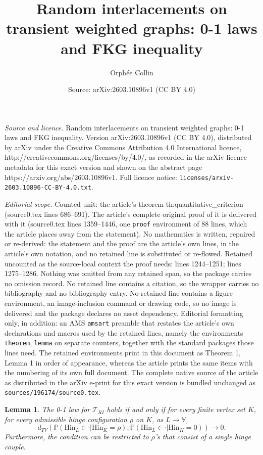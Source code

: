 \documentclass[10pt,a4paper]{amsart}
\title{Random interlacements on transient weighted graphs: 0-1 laws and FKG inequality}
\author{Orph\'ee Collin}
\date{Source: arXiv:2603.10896v1 (CC BY 4.0)}
\newtheorem{lemma}{Lemma}
\newcommand{\Hin}{\mathrm{Hin}}
\begin{document}
\maketitle

\noindent\emph{Source and licence.} Random interlacements on transient weighted graphs: 0-1 laws and FKG inequality. Version arXiv:2603.10896v1 (CC BY 4.0), distributed by arXiv under the Creative Commons Attribution 4.0 International licence, http://creativecommons.org/licenses/by/4.0/, as recorded in the arXiv licence metadata for this exact version and shown on the abstract page https://arxiv.org/abs/2603.10896v1. Full licence notice: \texttt{licenses/arxiv-2603.10896-CC-BY-4.0.txt}.\par\smallskip

\noindent\textit{Editorial scope.} Counted unit: the article's theorem th:quantitative\_criterion (source0.tex lines 686--691). The article's complete original proof of it is delivered with it (source0.tex lines 1359--1446, one \texttt{proof} environment of 88 lines, which the article places away from the statement). No mathematics is written, repaired or re-derived: the statement and the proof are the article's own lines, in the article's own notation, and no retained line is substituted or re-flowed.  Retained uncounted as the source-local context the proof needs: lines 1244--1251; lines 1275--1286.  Nothing was omitted from any retained span, so the package carries no omission record.  No retained line contains a citation, so the wrapper carries no bibliography and no bibliography entry.  No retained line contains a figure environment, an image-inclusion command or drawing code, so no image is delivered and the package declares no asset dependency.  Editorial formatting only, in addition: an AMS \texttt{amsart} preamble that restates the article's own declarations and macros used by the retained lines, namely the environments \texttt{theorem}, \texttt{lemma} on separate counters, together with the standard packages those lines need.  The retained environments print in this document as Theorem 1, Lemma 1 in order of appearance, whereas the article prints the same items with the numbering of its own full document.  The complete native source of the article as distributed in the arXiv e-print for this exact version is bundled unchanged as \texttt{sources/196174/source0.tex}.
\begin{lemma}\label{lem:criterion_dTV_to_0_law}
  The 0-1 law for $\mathcal{T}_{RI}$ holds if and only if for every finite vertex set $K$, for every admissible hinge configuration $\rho$ on $K$, as $L\to \mathbb{V}$,
  \begin{equation}\label{eq:criterion_d_TV_cond}
    d_{TV}\left(\mathbb{P}(\Hin_L \in \cdot | \Hin_K=\rho),
    \mathbb{P}(\Hin_L \in \cdot | \Hin_K=0) \right) \to 0.
  \end{equation}
  Furthermore, the condition can be restricted to $\rho$'s that consist of a single hinge couple.
\end{lemma}
\end{document}

